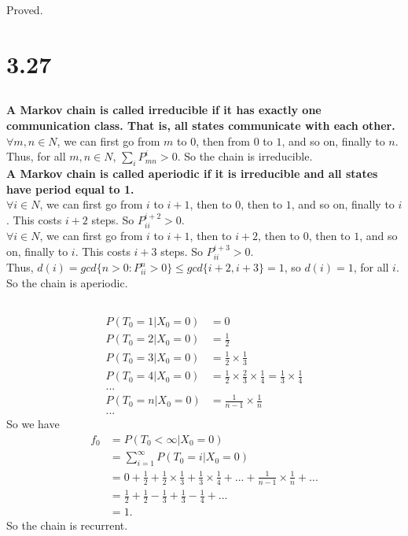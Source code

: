 \documentclass{article}
\begin{document}
Proved.
\section{3.27}
\subsection{}
\textbf{A Markov chain is called irreducible if it has exactly one communication class. That is, all states communicate with each other.} \\
$\forall m, n \in N$, we can first go from $m$ to $0$, then from $0$ to $1$, and so on, finally to $n$. \\
Thus, for all $m, n \in N$, $\sum\limits_i P_{mn}^i > 0$. So the chain is irreducible. \\
\textbf{A Markov chain is called aperiodic if it is irreducible and all states have period equal to 1. }\\
$\forall i \in N$, we can first go from $i$ to $i+1$, then to $0$, then to $1$, and so on, finally to $i$. This costs $i+2$ steps. So $P_{ii}^{i+2} > 0$. \\
$\forall i \in N$, we can first go from $i$ to $i+1$, then to $i+2$, then to $0$, then to $1$, and so on, finally to $i$. This costs $i+3$ steps. So $P_{ii}^{i+3} > 0$. \\
Thus, $d(i)=gcd\{n>0:P_{ii}^n>0\} \leq gcd\{i+2, i+3\}=1$, so $d(i)=1$, for all $i$. \\
So the chain is aperiodic. 
\subsection{}
\begin{align*}
    P(T_0=1|X_0=0)&=0 \\
    P(T_0=2|X_0=0)&=\frac{1}{2} \\
    P(T_0=3|X_0=0)&=\frac{1}{2}\times \frac{1}{3} \\
    P(T_0=4|X_0=0)&=\frac{1}{2}\times \frac{2}{3} \times \frac{1}{4} = \frac{1}{3} \times \frac{1}{4} \\
    ...\\
    P(T_0=n|X_0=0)&=\frac{1}{n-1} \times \frac{1}{n} \\
    ...
\end{align*}
So we have
\begin{align*}
    f_0&=P(T_0 < \infty|X_0=0)\\
    &=\sum_{i=1}^\infty P(T_0=i|X_0=0) \\
    &=0+\frac{1}{2}+\frac{1}{2}\times \frac{1}{3} + \frac{1}{3} \times \frac{1}{4}+...+\frac{1}{n-1} \times \frac{1}{n} +... \\
    &=\frac{1}{2}+\frac{1}{2}-\frac{1}{3}+\frac{1}{3}-\frac{1}{4}+... \\
    &=1.
\end{align*}
So the chain is recurrent. 
\end{document}
